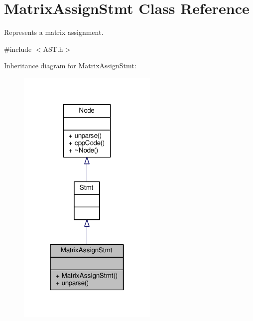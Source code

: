 \hypertarget{classMatrixAssignStmt}{\section{Matrix\-Assign\-Stmt Class Reference}
\label{classMatrixAssignStmt}
}


Represents a matrix assignment. \par
  




{\ttfamily \#include $<$A\-S\-T.\-h$>$}



Inheritance diagram for Matrix\-Assign\-Stmt\-:\nopagebreak
\begin{figure}[H]
\begin{center}
\leavevmode
\includegraphics[width=190pt]{classMatrixAssignStmt__inherit__graph}
\end{center}
\end{figure}


